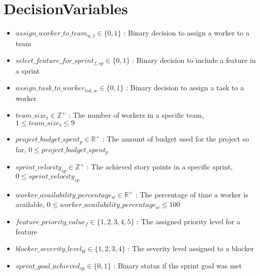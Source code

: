 \documentclass{article}
\begin{document}
\section{DecisionVariables}
\begin{itemize}
    \item $assign\_worker\_to\_team_{w,t} \in \{0, 1\}$ : Binary decision to assign a worker to a team
    \item $select\_feature\_for\_sprint_{f,sp} \in \{0, 1\}$ : Binary decision to include a feature in a sprint
    \item $assign\_task\_to\_worker_{tsk,w} \in \{0, 1\}$ : Binary decision to assign a task to a worker
    \item $team\_size_t \in \mathbb{Z}^+$ : The number of workers in a specific team, $1 \leq team\_size_t \leq 9$
    \item $project\_budget\_spent_p \in \mathbb{R}^+$ : The amount of budget used for the project so far, $0 \leq project\_budget\_spent_p$
    \item $sprint\_velocity_{sp} \in \mathbb{Z}^+$ : The achieved story points in a specific sprint, $0 \leq sprint\_velocity_{sp}$
    \item $worker\_availability\_percentage_w \in \mathbb{R}^+$ : The percentage of time a worker is available, $0 \leq worker\_availability\_percentage_w \leq 100$
    \item $feature\_priority\_value_f \in \{1,2,3,4,5\}$ : The assigned priority level for a feature
    \item $blocker\_severity\_level_{bl} \in \{1,2,3,4\}$ : The severity level assigned to a blocker
    \item $sprint\_goal\_achieved_{sp} \in \{0, 1\}$ : Binary status if the sprint goal was met
\end{itemize}
\end{document}
